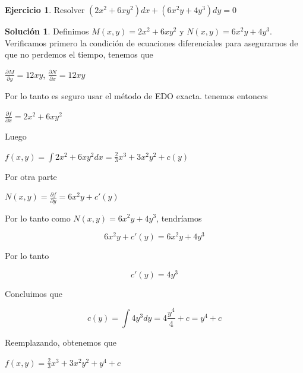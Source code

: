 \documentclass{article}
\theoremstyle{plain}
\theoremstyle{definition}
\newtheorem{ejer}[thm]{Ejercicio}
\newtheorem{sol}[thm]{Solución}
\begin{document}
\begin{ejer}Resolver $(2x^2+6xy^2)dx+(6x^2y+4y^3)dy=0$\\
\end{ejer}

\begin{sol}Definimos $M(x,y)= 2x^2+6xy^2$ y $N(x,y)= 6x^2y+4y^3$. Verificamos primero la condición de ecuaciones diferenciales para asegurarnos de que no perdemos el tiempo, tenemos que
\end{sol}

\begin{center}
$\displaystyle \frac{\partial M}{\partial y}= 12xy$,  $\displaystyle \frac{\partial N}{\partial x}= 12xy$
\end{center}

Por lo tanto es seguro usar el método de EDO exacta. tenemos entonces

\begin{center}
$\displaystyle \frac{\partial f}{\partial x} = 2x^2+6xy^2$
\end{center}

Luego

\begin{center}
$f(x,y) = \displaystyle \int 2x^2+6xy^2 dx = \frac{2}{3}x^3+3x^2y^2 +c(y)$
\end{center}

Por otra parte


\begin{center}
$N(x,y)= \displaystyle \frac{\partial f}{\partial y} = 6x^2y+c'(y) $
\end{center}

Por lo tanto como $N(x,y)= 6x^2y+4y^3$, tendríamos

\begin{center}
$$6x^2y+c'(y)=6x^2y+4y^3$$
\end{center}

Por lo tanto

\begin{center}
$$c'(y)=4y^3$$
\end{center}

Concluimos que

\begin{center}
$$c(y)=\displaystyle \int 4y^3 dy = 4 \frac{y^4}{4} +c = y^4 +c$$
\end{center}

\newpage

Reemplazando, obtenemos que

\begin{center}
$f(x,y) = \displaystyle  \frac{2}{3}x^3+3x^2y^2 + y^4+c$
\end{center}
\end{document}
